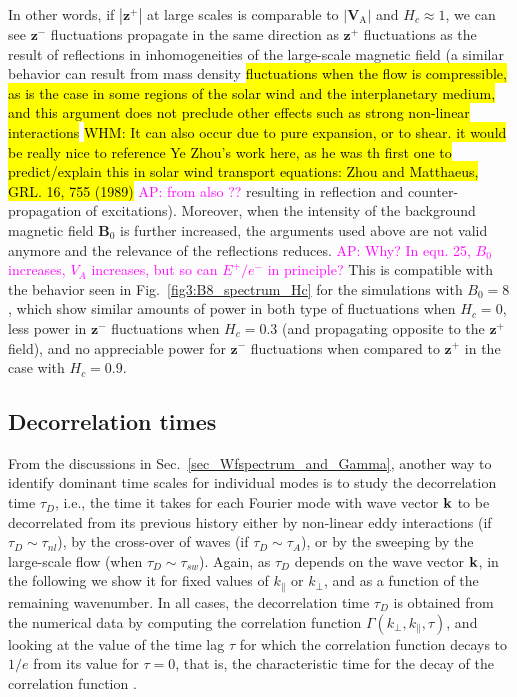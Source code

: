 \documentclass[aip,pop,reprint,amsmath,amssymb,floatfix]{revtex4-1}
\def\AD#1{{\textcolor{magenta}{#1}}}
\def\WHM#1{{\hl{WHM: #1}}}
\renewcommand{\vec}[1]{\mathbf{#1}}
\begin{document}
In other words, if $|\vec{z}^+|$ at large scales is comparable to $|\vec{V}_\textrm{A}|$ and $H_c \approx 1$, we can see $\vec{z}^-$ fluctuations propagate in the same direction as $\vec{z}^+$ fluctuations as the result of reflections in inhomogeneities of the large-scale magnetic field (a similar behavior can result from mass density \hl{fluctuations when the flow is compressible, as is the case in some regions of the solar wind and the interplanetary medium, and this argument does not preclude other effects such as strong non-linear interactions} \WHM{It can also occur due to pure expansion, or to shear. 
it would be really nice to reference Ye Zhou's work here, as he was th first one to predict/explain this in solar wind transport equations:
Zhou and Matthaeus, GRL. 16, 755 (1989) }
\AD{AP: from also ??}
resulting in reflection and counter-propagation of excitations). Moreover, when the intensity of the background magnetic field $\vec{B}_0$ is further increased, the arguments used above are not valid anymore and the relevance of the reflections reduces. 
\AD{AP: Why? In equ. 25, $B_0$ increases, $V_A$ increases, but so can $E^+/e^-$ in principle?}
This is compatible with the behavior seen in  Fig.~\ref{fig3:B8_spectrum_Hc} for the simulations with $B_0=8$, which show similar amounts of power in both type of fluctuations when $H_c=0$, less power in $\vec{z}^-$ fluctuations when $H_c=0.3$ (and propagating opposite to the $\vec{z}^+$ field), and no appreciable power for $\vec{z}^-$ fluctuations when compared to $\vec{z}^+$ in the case with $H_c=0.9$. 

\subsection{Decorrelation times}

From the discussions in Sec.~\ref{sec_Wfspectrum_and_Gamma}, another way to identify dominant time scales for individual modes is to study the decorrelation time $\tau_D$, i.e., the time it takes for each Fourier mode with wave vector ${\bf k}$ to be decorrelated from its previous history either by non-linear eddy interactions (if $\tau_D \sim \tau_{nl}$), by the cross-over of waves (if $\tau_D \sim \tau_A$), or by the sweeping by the large-scale flow (when $\tau_D \sim \tau_{sw}$). Again, as $\tau_D$ depends on the wave vector ${\bf k}$, in the following we show it for fixed values of $k_\parallel$ or $k_\perp$, and as a function of the remaining wavenumber. In all cases, the decorrelation time $\tau_D$ is obtained from the numerical data by computing the correlation function $\Gamma(k_{\perp},k_{\parallel},\tau)$, and looking at the value of the time lag $\tau$ for which the correlation function decays to $1/e$ from its value for $\tau=0$, that is, the 
characteristic time for the decay of the correlation function \cite{lugones_2016_spatiotemporal}.
\end{document}
